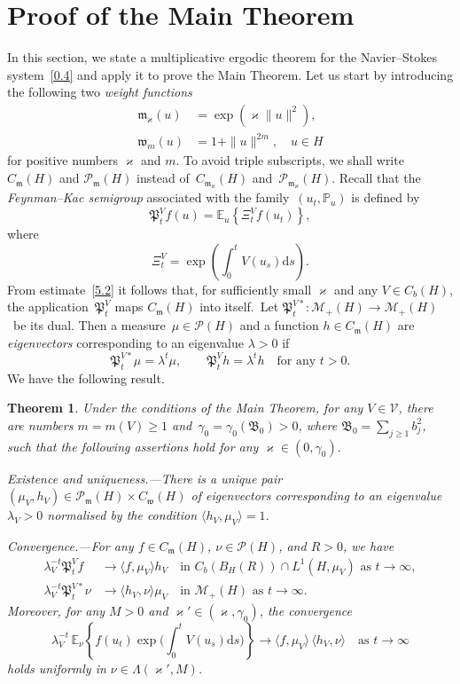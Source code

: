 \documentclass[10pt]{amsart}
\newtheorem{theo}{Theorem}[section]
\theoremstyle{definition}\newtheorem{defi}[theo]{Definition}\newtheorem{rema}[theo]{Remark}\newtheorem{exam}[theo]{Example}\newtheorem{exem}[theo]{Example}\newtheorem{nota}[theo]{Notation}
\newcommand{\IP}{{\mathbb P}}
\newcommand{\E}{{\mathbb E}}
\newcommand{\MM}{{\mathcal M}}
\newcommand{\PP}{{\mathcal P}}
\newcommand{\VV}{{\mathcal V}}
\newcommand{\vk}{{\varkappa}}
\newcommand{\la}{\lambda}
\newcommand{\wwww}{{\mathfrak w}}
\newcommand{\mm}{{\mathfrak m}}
\newcommand{\PPPP}{{\mathfrak P}}
\newcommand{\BBBB}{{\mathfrak B}}
\newcommand{\lag}{\langle}
\newcommand{\rag}{\rangle}
\newcommand{\dd}{\mathrm{d}}
\providecommand{\pointir}{.\enspace---\enspace}
\begin{document}
\section{Proof of the Main Theorem}\label{S:1}

In this section, we state a multiplicative ergodic theorem for the Navier--Stokes system~\eqref{0.4} and apply it to prove the Main Theorem. Let us start by introducing the following two \emph{weight functions}
\begin{align}
\mm_\vk(u)&=\exp(\vk \|u\|^2), \label{1.2}
\\
\wwww_m(u)&=1+\|u\|^{2m},\quad u\in H \label{1.1}
\end{align}
for positive numbers $\varkappa$ and $m$. To avoid triple subscripts, we shall write~$C_{\mm}(H)$ and $\PP_{\mm}(H)$ instead of~$C_{\mm_\vk}(H)$ and~$\PP_{\mm_\vk}(H)$. Recall that the \emph{Feynman--Kac semigroup} associated with the family~$(u_t,\IP_u)$ is defined by
\[
\PPPP_t^V f(u)=\E_u \left\{ \Xi^V_t f(u_t)\right\},
\]
where
\begin{equation}\label{ARM}
\Xi^V_t = \exp\left(\int_{0}^tV(u_s) \dd s\right).
\end{equation}
From estimate~\eqref{5.2} it follows that, for sufficiently small $\vk$ and any $V\in C_b(H)$, the application~$\PPPP_t^V$ maps $C_{\mm}(H)$ into itself.~Let $\PPPP_t^{V*}:\MM_+(H)\to \MM_+(H)$~be its dual. Then a measure~$\mu\in\PP(H)$ and a function $h\in C_\mm(H)$ are \emph{eigenvectors} corresponding to an eigenvalue $\la>0$ if
\[
\PPPP^{V*}_t\mu=\la^t \mu, \qquad \PPPP^V_t h=\la^t h\quad \text{for any~$t>0$}.
\]
We have the following result.


\begin{theo}\label{T:1.1}
Under the conditions of the Main Theorem, for any $V\in\VV$, there are numbers $m=m(V)\ge1$ and~$\gamma_0=\gamma_0(\BBBB_{0})>0$, where $\BBBB_{0}=\sum_{j\ge1}b_j^2$, such that the following assertions hold for any $\vk\in (0,\gamma_0).$

Existence and uniqueness\pointir There is a unique pair $(\mu_V,h_V)\!\in\! \PP_\mm(H)\times C_\wwww(H)$ of eigenvectors corresponding to an eigenvalue $\la_V>0$ normalised by the condition $\langle h_V,\mu_V\rangle=1$.

Convergence\pointir For any $f\in C_{\mm}(H)$, $\nu\in \PP(H)$, and $R>0$, we have
\begin{align}
\lambda_V^{-t}\PPPP_t^V f&\to\lag f,\mu_V\rag h_V \quad\text{in~$C_b(B_H(R))\cap L^1(H,\mu_V)$ as~$t\to\infty$}, \label{1.5}
\\
\lambda^{-t}_V\PPPP_t^{V*}\nu&\to\lag h_V,\nu\rag\mu_V
\quad\text{in~$\MM_+(H)$ as~$t\to\infty$}. \label{1.6}
\end{align}
Moreover, for any $M>0$ and $\vk'\in (\vk,\gamma_0)$, the convergence
\begin{equation}\label{1.7}
\lambda_V^{-t}\,\E_\nu\left\{f(u_t)\exp\bigg(\int_0^tV(u_s)\dd s\bigg)\right\}\to\langle f,\mu_V\rangle\,\langle h_V,\nu\rangle\quad \text{as } t\to\infty
\end{equation}
holds uniformly in $\nu\in\Lambda(\vk',M)$.
\end{theo}
\end{document}

